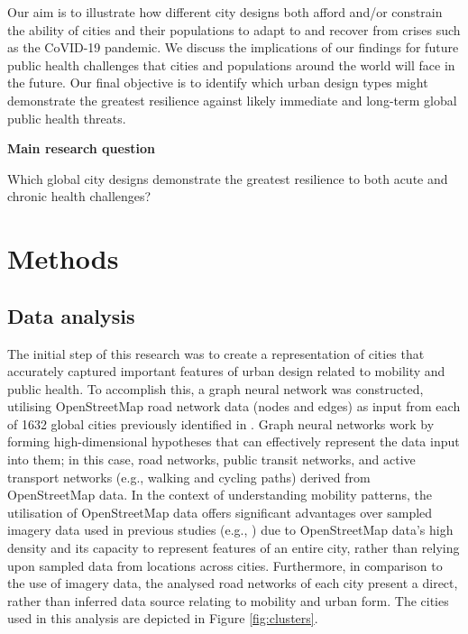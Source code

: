 \documentclass[preprint,12pt]{elsarticle}
\begin{document}
Our aim is to illustrate how different city designs both afford and/or constrain the ability of cities and their populations to adapt to and recover from crises such as the CoVID-19 pandemic. We discuss the implications of our findings for future public health challenges that cities and populations around the world will face in the future. Our final objective is to identify which urban design types might demonstrate the greatest resilience against likely immediate and long-term global public health threats. 


\textbf{Main research question}

 Which global city designs demonstrate the greatest resilience to both acute and chronic health challenges?








\section*{Methods}



\subsection*{Data analysis}
The initial step of this research was to create a representation of cities that accurately captured important features of urban design related to mobility and public health. To accomplish this, a graph neural network was constructed, utilising OpenStreetMap road network data (nodes and edges) as input from each of 1632 global cities previously identified in \cite{Thompson2020}. Graph neural networks work by forming high-dimensional hypotheses that can effectively represent the data input into them; in this case, road networks, public transit networks, and active transport networks (e.g., walking and cycling paths) derived from OpenStreetMap data\cite{Boeing2017a}. In the context of understanding mobility patterns, the utilisation of OpenStreetMap data offers significant advantages over sampled imagery data used in previous studies (e.g., \cite{Thompson2020,seneviratne2021self}) due to OpenStreetMap data's high density and its capacity to represent features of an entire city, rather than relying upon sampled data from locations across cities. Furthermore, in comparison to the use of imagery data, the analysed road networks of each city present a direct, rather than inferred data source relating to mobility and urban form. The cities used in this analysis are depicted in Figure \ref{fig:clusters}.
\end{document}
